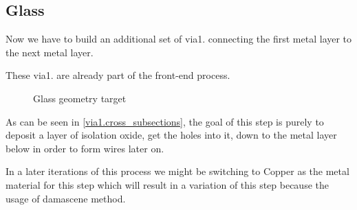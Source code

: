 \subsection{Glass}\label{chapter_glass}

Now we have to build an additional set of via1. connecting the first metal layer to the next metal layer.

These via1. are already part of the front-end process.

\begin{figure}[H]
	\centering
	\begin{tikzpicture}[node distance = 3cm, auto, thick,scale=\CrossSectionOnly, every node/.style={transform shape}]
		
	\end{tikzpicture}
	\caption{Glass geometry target}
	\label{glass_cross_subsections}
\end{figure}

As can be seen in \autoref{via1.cross_subsections}, the goal of this step is purely to deposit a layer of isolation oxide,
get the holes into it, down to the metal layer below in order to form wires later on.

In a later iterations of this process we might be switching to Copper as the metal material for this step which will
result in a variation of this step because the usage of damascene method.
